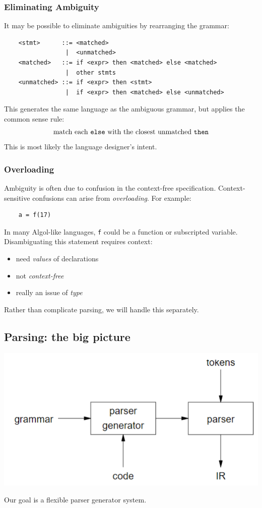 \documentclass[10pt]{article}
\begin{document}
\subsubsection*{Eliminating Ambiguity} 
It may be possible to eliminate ambiguities by rearranging the grammar:
\begin{verbatim}
    <stmt>      ::= <matched>
                 |  <unmatched>
    <matched>   ::= if <expr> then <matched> else <matched>
                 |  other stmts
    <unmatched> ::= if <expr> then <stmt>
                 |  if <expr> then <matched> else <unmatched>
\end{verbatim}
This generates the same language as the ambiguous grammar, but applies the common sense rule:
\[\text{match each \texttt{else} with the closest unmatched \texttt{then}}\]
This is most likely the language designer's intent.

\subsubsection*{Overloading}
Ambiguity is often due to confusion in the context-free specification.  Context-sensitive confusions can arise from \textit{overloading}.
For example:
\begin{verbatim}
    a = f(17)
\end{verbatim}
In many Algol-like languages, \texttt{f} could be a function or subscripted variable.  Disambiguating this statement requires context:
\begin{itemize}
    \item need \textit{values} of declarations
    \item not \textit{context-free}
    \item really an issue of \textit{type}
\end{itemize}   
Rather than complicate parsing, we will handle this separately.

\subsection*{Parsing: the big picture}
\begin{center}
    \includegraphics*[scale=1]{W1_11.png}
\end{center}
Our goal is a flexible parser generator system.
\end{document}
